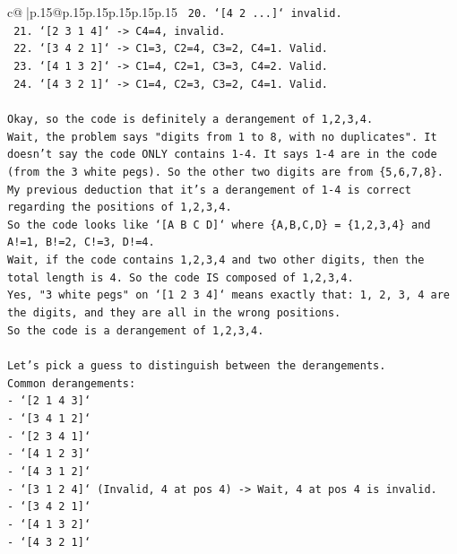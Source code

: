 \documentclass{article}
\begin{document}
{\begin{supertabular}{c@{$\;$}|p{.15\linewidth}@{}p{.15\linewidth}p{.15\linewidth}p{.15\linewidth}p{.15\linewidth}p{.15\linewidth}}
{{{\texttt{    20. `{[}4 2 ...{]}` invalid.} \\
\texttt{    21. `{[}2 3 1 4{]}` {-}> C4=4, invalid.} \\
\texttt{    22. `{[}3 4 2 1{]}` {-}> C1=3, C2=4, C3=2, C4=1. Valid.} \\
\texttt{    23. `{[}4 1 3 2{]}` {-}> C1=4, C2=1, C3=3, C4=2. Valid.} \\
\texttt{    24. `{[}4 3 2 1{]}` {-}> C1=4, C2=3, C3=2, C4=1. Valid.} \\
\\ 
\texttt{Okay, so the code is definitely a derangement of 1,2,3,4.} \\
\texttt{Wait, the problem says "digits from 1 to 8, with no duplicates". It doesn't say the code ONLY contains 1{-}4. It says 1{-}4 are in the code (from the 3 white pegs). So the other two digits are from \{5,6,7,8\}.} \\
\texttt{My previous deduction that it's a derangement of 1{-}4 is correct regarding the positions of 1,2,3,4.} \\
\texttt{So the code looks like `{[}A B C D{]}` where \{A,B,C,D\} = \{1,2,3,4\} and A!=1, B!=2, C!=3, D!=4.} \\
\texttt{Wait, if the code contains 1,2,3,4 and two other digits, then the total length is 4. So the code IS composed of 1,2,3,4.} \\
\texttt{Yes, "3 white pegs" on `{[}1 2 3 4{]}` means exactly that: 1, 2, 3, 4 are the digits, and they are all in the wrong positions.} \\
\texttt{So the code is a derangement of 1,2,3,4.} \\
\\ 
\texttt{Let's pick a guess to distinguish between the derangements.} \\
\texttt{Common derangements:} \\
\texttt{{-} `{[}2 1 4 3{]}`} \\
\texttt{{-} `{[}3 4 1 2{]}`} \\
\texttt{{-} `{[}2 3 4 1{]}`} \\
\texttt{{-} `{[}4 1 2 3{]}`} \\
\texttt{{-} `{[}4 3 1 2{]}`} \\
\texttt{{-} `{[}3 1 2 4{]}` (Invalid, 4 at pos 4) {-}> Wait, 4 at pos 4 is invalid.} \\
\texttt{{-} `{[}3 4 2 1{]}`} \\
\texttt{{-} `{[}4 1 3 2{]}`} \\
\texttt{{-} `{[}4 3 2 1{]}`} \\
}}}
\end{supertabular}}
\end{document}
